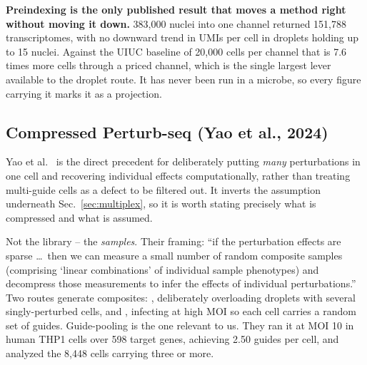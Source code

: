 
\begin{keybox}
\textbf{Preindexing is the only published result that moves a method right
without moving it down.} 383{,}000 nuclei into one channel returned 151{,}788
transcriptomes, with no downward trend in UMIs per cell in droplets holding up
to 15 nuclei. Against the UIUC baseline of 20{,}000 cells per channel that is
7.6 times more cells through a priced channel, which is the single largest lever
available to the droplet route. It has never been run in a microbe, so every
figure carrying it marks it as a projection.
\end{keybox}

\subsection{Compressed Perturb-seq (Yao et al., 2024)}
\label{sec:yao}

Yao et al.\ \citep{yaoScalableGeneticScreening2024} is the direct precedent for deliberately
putting \emph{many} perturbations in one cell and recovering individual effects
computationally, rather than treating multi-guide cells as a defect to be filtered
out. It inverts the assumption underneath Sec.~\ref{sec:multiplex}, so it is worth
stating precisely what is compressed and what is assumed.

 Not the library -- the \emph{samples}. Their framing:
``if the perturbation effects are sparse \dots\ then we can measure a small number
of random composite samples (comprising `linear combinations' of individual sample
phenotypes) and decompress those measurements to infer the effects of individual
perturbations.'' Two routes generate composites: , deliberately
overloading droplets with several singly-perturbed cells, and ,
infecting at high MOI so each cell carries a random set of guides. Guide-pooling is
the one relevant to us. They ran it at MOI 10 in human THP1 cells over 598 target
genes, achieving 2.50 guides per cell, and analyzed the 8{,}448 cells carrying
three or more.

